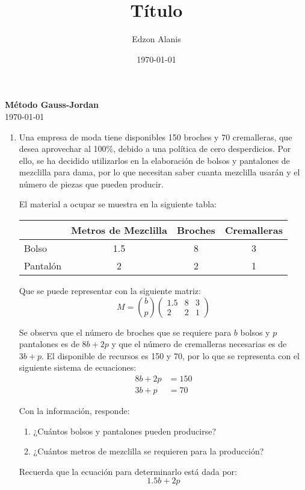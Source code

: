 \documentclass[12pt]{article}
\title{Título}
\author{Edzon Alanis}
\date{\today}
\begin{document}
\maketitle

\begin{center}
    \textbf{\Large Método Gauss-Jordan}\\[0.5cm]
    \today
\end{center}

\begin{enumerate}
    \item Una empresa de moda tiene disponibles 150 broches y 70 cremalleras, que desea aprovechar al 100\%, debido a una política de cero desperdicios. Por ello, se ha decidido utilizarlos en la elaboración de bolsos y pantalones de mezclilla para dama, por lo que necesitan saber cuanta mezclilla usarán y el número de piezas que pueden producir.
    
    El material a ocupar se muestra en la siguiente tabla: 
    \begin{table}[h]
        \centering
        \begin{tabular}{c|c|c|c|}
        \cline{2-4}
                                    & Metros de Mezclilla & Broches & Cremalleras \\ \hline
        \multicolumn{1}{|l|}{Bolso}    & 1.5                 & 8       & 3           \\ \hline
        \multicolumn{1}{|l|}{Pantalón} & 2                   & 2       & 1           \\ \hline
        \end{tabular}
    \end{table}

    Que se puede representar con la siguiente matriz:
    \[M = \binom{b}{p} \begin{pmatrix}
        1.5 & 8 & 3 \\
        2 & 2 & 1
    \end{pmatrix}\]

    Se observa que el número de broches que se requiere para $b$ bolsos y $p$ pantalones es de $8b+2p$ y que el número de cremalleras necesarias es de $3b+p$. El disponible de recursos es 150 y 70, por lo que se representa con el siguiente sistema de ecuaciones:
    \begin{align*}
        8b + 2p &= 150 \\
        3b + p &= 70
    \end{align*}

    Con la información, responde: 
    \begin{enumerate}
        \item ¿Cuántos bolsos y pantalones pueden producirse?
        \item ¿Cuántos metros de mezclilla se requieren para la producción? 
    \end{enumerate}

    Recuerda que la ecuación para determinarlo está dada por: 
    \[1.5b + 2p\]
\end{enumerate}


\end{document}
